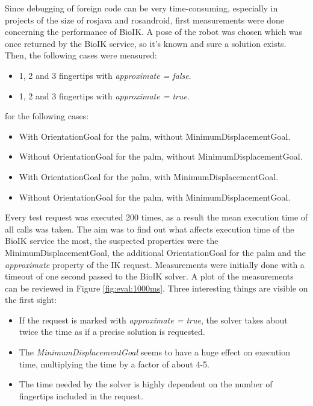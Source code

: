 Since debugging of foreign code can be very time-consuming, especially in projects of the size of rosjava and rosandroid, first measurements were done concerning the performance of BioIK. A pose of the robot was chosen which was once returned by the BioIK service, so it's known and sure a solution exists. Then, the following cases were measured:
\begin{itemize}
	\item 1, 2 and 3 fingertips with \textit{approximate = false}.
	\item 1, 2 and 3 fingertips with \textit{approximate = true}.
\end{itemize}

for the following cases:
\begin{itemize}
	\item With OrientationGoal for the palm, without MinimumDisplacementGoal.
	\item Without OrientationGoal for the palm, without MinimumDisplacementGoal.
	\item With OrientationGoal for the palm, with MinimumDisplacementGoal.
	\item Without OrientationGoal for the palm, with MinimumDisplacementGoal.
\end{itemize}

Every test request was executed 200 times, as a result the mean execution time of all calls was taken. The aim was to find out what affects execution time of the BioIK service the most, the suspected properties were the MinimumDisplacementGoal, the additional OrientationGoal for the palm and the \textit{approximate} property of the IK request. Measurements were initially done with a timeout of one second passed to the BioIK solver. A plot of the measurements can be reviewed in Figure \ref{fig:eval:1000ms}. Three interesting things are visible on the first sight:
\begin{itemize}
	\item If the request is marked with \textit{approximate = true}, the solver takes about twice the time as if a precise solution is requested.
	\item The \textit{MinimumDisplacementGoal} seems to have a huge effect on execution time, multiplying the time by a factor of about 4-5.
	\item The time needed by the solver is highly dependent on the number of fingertips included in the request. 
\end{itemize}

